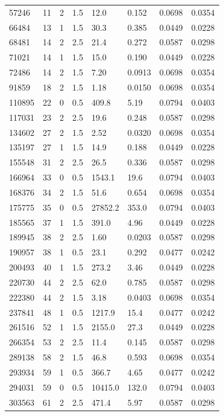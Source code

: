 \documentclass[preview]{standalone}
\begin{document}
{{\begin{tabular}{L{1.2cm}C{1.2cm} C{0.3cm}C{0.5cm} C{1.4cm}C{1.4cm} C{1.4cm}C{1.4cm}}
  57246  &    11  & 2     & 1.5 &  12.0  & 0.152  & 0.0698 &  0.0354   \\ 
  66484  &    13  & 1     & 1.5 &  30.3  & 0.385  & 0.0449 &  0.0228   \\ 
  68481  &    14  & 2     & 2.5 &  21.4  & 0.272  & 0.0587 &  0.0298   \\ 
  71021  &    14  & 1     & 1.5 &  15.0  & 0.190  & 0.0449 &  0.0228   \\ 
  72486  &    14  & 2     & 1.5 &  7.20  & 0.0913  & 0.0698 &  0.0354   \\ 
  91859  &    18  & 2     & 1.5 &  1.18  & 0.0150  & 0.0698 &  0.0354   \\ 
  110895  &    22  & 0     & 0.5 &  409.8  & 5.19  & 0.0794 &  0.0403   \\ 
  117031  &    23  & 2     & 2.5 &  19.6  & 0.248  & 0.0587 &  0.0298   \\ 
  134602  &    27  & 2     & 1.5 &  2.52  & 0.0320  & 0.0698 &  0.0354   \\ 
  135197  &    27  & 1     & 1.5 &  14.9  & 0.188  & 0.0449 &  0.0228   \\ 
  155548  &    31  & 2     & 2.5 &  26.5  & 0.336  & 0.0587 &  0.0298   \\ 
  166964  &    33  & 0     & 0.5 &  1543.1  & 19.6  & 0.0794 &  0.0403   \\ 
  168376  &    34  & 2     & 1.5 &  51.6  & 0.654  & 0.0698 &  0.0354   \\ 
  175775  &    35  & 0     & 0.5 &  27852.2  & 353.0  & 0.0794 &  0.0403   \\ 
  185565  &    37  & 1     & 1.5 &  391.0  & 4.96  & 0.0449 &  0.0228   \\ 
  189945  &    38  & 2     & 2.5 &  1.60  & 0.0203  & 0.0587 &  0.0298   \\ 
  190957  &    38  & 1     & 0.5 &  23.1  & 0.292  & 0.0477 &  0.0242   \\ 
  200493  &    40  & 1     & 1.5 &  273.2  & 3.46  & 0.0449 &  0.0228   \\ 
  220730  &    44  & 2     & 2.5 &  62.0  & 0.785  & 0.0587 &  0.0298   \\ 
  222380  &    44  & 2     & 1.5 &  3.18  & 0.0403  & 0.0698 &  0.0354   \\ 
  237841  &    48  & 1     & 0.5 &  1217.9  & 15.4  & 0.0477 &  0.0242   \\ 
  261516  &    52  & 1     & 1.5 &  2155.0  & 27.3  & 0.0449 &  0.0228   \\ 
  266354  &    53  & 2     & 2.5 &  11.4  & 0.145  & 0.0587 &  0.0298   \\ 
  289138  &    58  & 2     & 1.5 &  46.8  & 0.593  & 0.0698 &  0.0354   \\ 
  293934  &    59  & 1     & 0.5 &  366.7  & 4.65  & 0.0477 &  0.0242   \\ 
  294031  &    59  & 0     & 0.5 &  10415.0  & 132.0  & 0.0794 &  0.0403   \\ 
  303563  &    61  & 2     & 2.5 &  471.4  & 5.97  & 0.0587 &  0.0298   \\ 
\hline 
\end{tabular} 

}}
\end{document}
